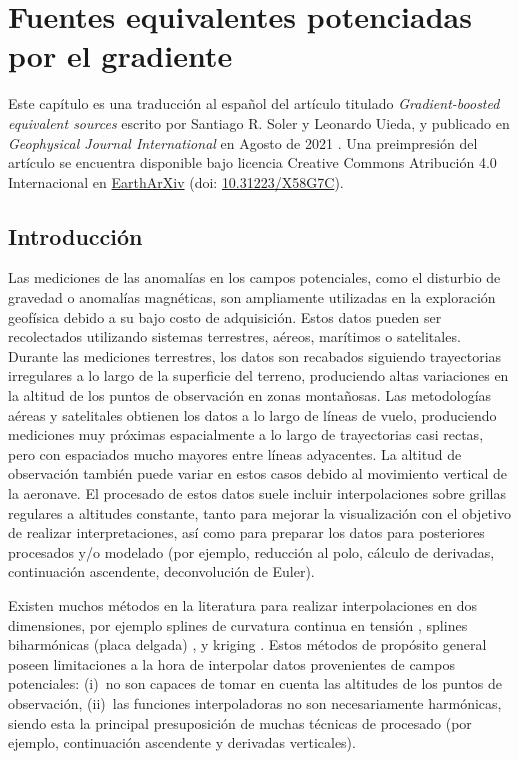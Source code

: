 \chapter[Fuentes equivalentes potenciadas por el gradiente]{
    Fuentes equivalentes potenciadas por el gradiente
}
\label{cha:eql-gradient-boosted}

Este capítulo es una traducción al español del artículo titulado
\emph{Gradient-boosted equivalent sources} escrito por Santiago R. Soler
y Leonardo Uieda, y publicado en \emph{Geophysical Journal
International} en Agosto de 2021 \citep{soler2021}.
Una preimpresión del artículo se encuentra disponible bajo licencia Creative
Commons Atribución 4.0 Internacional en
\href{https://eartharxiv.org/}{EarthArXiv} (doi:
\href{https://doi.org/10.31223/X58G7C}{10.31223/X58G7C}).





\section{Introducción}

Las mediciones de las anomalías en los campos potenciales, como el disturbio de
gravedad o anomalías magnéticas, son ampliamente utilizadas en la exploración
geofísica debido a su bajo costo de adquisición.
Estos datos pueden ser recolectados utilizando sistemas terrestres, aéreos,
marítimos o satelitales.
Durante las mediciones terrestres, los datos son recabados siguiendo
trayectorias irregulares a lo largo de la superficie del terreno, produciendo
altas variaciones en la altitud de los puntos de observación en zonas
montañosas.
Las metodologías aéreas y satelitales obtienen los datos a lo largo de líneas
de vuelo, produciendo mediciones muy próximas espacialmente a lo largo de
trayectorias casi rectas, pero con espaciados mucho mayores entre líneas
adyacentes.
La altitud de observación también puede variar en estos casos debido al
movimiento vertical de la aeronave.
El procesado de estos datos suele incluir interpolaciones sobre grillas
regulares a altitudes constante, tanto para mejorar la visualización con el
objetivo de realizar interpretaciones, así como para preparar los datos para
posteriores procesados y/o modelado (por ejemplo, reducción al polo, cálculo de
derivadas, continuación ascendente, deconvolución de Euler).

Existen muchos métodos en la literatura para realizar interpolaciones en dos
dimensiones, por ejemplo splines de curvatura continua en tensión
\citep{smith1990}, splines biharmónicas (placa delgada) \citep{sandwell1987},
y kriging \citep{hansen1993}.
Estos métodos de propósito general poseen limitaciones a la hora de interpolar
datos provenientes de campos potenciales:
(i)~no son capaces de tomar en cuenta las altitudes de los puntos de
observación,
(ii)~las funciones interpoladoras no son necesariamente harmónicas, siendo esta
la principal presuposición de muchas técnicas de procesado (por ejemplo,
continuación ascendente y derivadas verticales).

